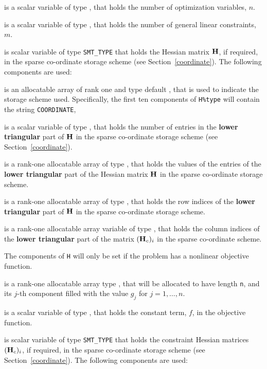 \documentclass{galahad}
\begin{document}
\begin{description}

 is a scalar variable of type \integer,
 that holds the number of optimization variables, $n$.

 is a scalar variable of type \integer,
 that holds the number of general linear constraints, $m$.

 is scalar variable of type {\tt SMT\_TYPE}
that holds the Hessian matrix ${\mathbf{H}}$, if required,
in the sparse co-ordinate storage scheme (see Section~\ref{coordinate}).
The following components are used:

\begin{description}

 is an allocatable array of rank one and type default \character,
that is used to indicate the storage scheme used. Specifically,
the first ten components of {\tt H\%type} will contain the
string {\tt COORDINATE},

 is a scalar variable of type \integer, that
holds the number of entries in the {\bf lower triangular} part of ${\mathbf{H}}$
in the sparse co-ordinate storage scheme (see Section~\ref{coordinate}).

 is a rank-one allocatable array of type \realdp, that
holds the values of the entries of the {\bf lower triangular} part
of the Hessian matrix ${\mathbf{H}}$ in the sparse co-ordinate storage scheme.

 is a rank-one allocatable array of type \integer,
that holds the row indices of the {\bf lower triangular} part of ${\mathbf{H}}$
in the sparse co-ordinate storage scheme.

 is a rank-one allocatable array variable of type \integer,
that holds the column indices of the {\bf lower triangular} part of the
matrix $({\mathbf{H}}_c)_i$ in the sparse co-ordinate scheme.

\end{description}

The components of {\tt H} will only be set if the problem has a
nonlinear objective function.

 is a rank-one allocatable array type \realdp, that
will be allocated to have length {\tt n}, and its $j$-th component
filled with the value $g_{j}$ for $j = 1, \ldots , n$.

 is a scalar variable of type \realdp, that holds the
constant term, $f$, in the objective function.

 is scalar variable of type {\tt SMT\_TYPE}
that holds the constraint Hessian matrices $({\mathbf{H}}_c)_i$, if required,
in the sparse co-ordinate storage scheme (see Section~\ref{coordinate}).
The following components are used:


\end{description}
\end{document}
